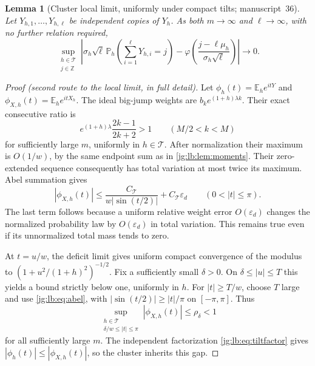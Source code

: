 \documentclass[11pt,a4paper]{article}
\newtheorem{lemma}[lemma]{Lemma}
\theoremstyle{definition}\newaliascnt{definition}{theorem}
\theoremstyle{remark}\newaliascnt{remark}{theorem}
\newcommand{\eps}{\varepsilon}
\newcommand{\ljP}{\mathbb P}
\newcommand{\ljE}{\mathbb E}
\begin{document}
\begin{lemma}[Cluster local limit, uniformly under compact tilts; manuscript~36]
\label{jg:lb:lem:llt}
Let $Y_{h,1},\ldots,Y_{h,\ell}$ be independent copies of $Y_h$. As both
$m\to\infty$ and $\ell\to\infty$, with no further relation required,
\begin{equation}\label{jg:lb:eq:llt}
 \sup_{\substack{h\in\mathcal T\\j\in\mathbb Z}}
 \left|
 \sigma_h\sqrt\ell\,
   \ljP_h\!\left(\sum_{i=1}^{\ell}Y_{h,i}=j\right)
 -\varphi\!\left(\frac{j-\ell\mu_h}{\sigma_h\sqrt\ell}\right)
 \right|\longrightarrow0.
\end{equation}
\end{lemma}
\begin{proof}[Proof (second route to the local limit, in full detail)]
Let $\phi_h(t)=\ljE_he^{itY}$ and $\phi_{X,h}(t)=\ljE_he^{itX_h}$. The ideal
big-jump weights are $b_ke^{(1+h)\lambda k}$. Their exact consecutive ratio is
\[
 e^{(1+h)\lambda}\frac{2k-1}{2k+2}>1
 \qquad(M/2<k<M)
\]
for sufficiently large $m$, uniformly in $h\in\mathcal T$. After normalization
their maximum is $O(1/w)$, by the same endpoint sum as in
\cref{jg:lb:lem:moments}. Their zero-extended sequence consequently has total
variation at most twice its maximum. Abel summation gives
\begin{equation}\label{jg:lb:eq:abel}
 |\phi_{X,h}(t)|
 \le\frac{C_{\mathcal T}}{w|\sin(t/2)|}+C_{\mathcal T}\eps_d
 \qquad(0<|t|\le\pi).
\end{equation}
The last term follows because a uniform relative weight error $O(\eps_d)$
changes the normalized probability law by $O(\eps_d)$ in total variation. This
remains true even if its unnormalized total mass tends to zero.

At $t=u/w$, the deficit limit gives uniform compact convergence of the modulus
to $(1+u^2/(1+h)^2)^{-1/2}$. Fix a sufficiently small $\delta>0$. On
$\delta\le|u|\le T$ this yields a bound strictly below one, uniformly in $h$.
For $|t|\ge T/w$, choose $T$ large and use \eqref{jg:lb:eq:abel}, with
$|\sin(t/2)|\ge|t|/\pi$ on $[-\pi,\pi]$. Thus
\begin{equation}\label{jg:lb:eq:gap}
 \sup_{\substack{h\in\mathcal T\\\delta/w\le|t|\le\pi}}
       |\phi_{X,h}(t)|\le\rho_\delta<1
\end{equation}
for all sufficiently large $m$. The independent factorization
\eqref{jg:lb:eq:tiltfactor} gives $|\phi_h(t)|\le|\phi_{X,h}(t)|$, so the
cluster inherits this gap.


\end{proof}
\end{document}
